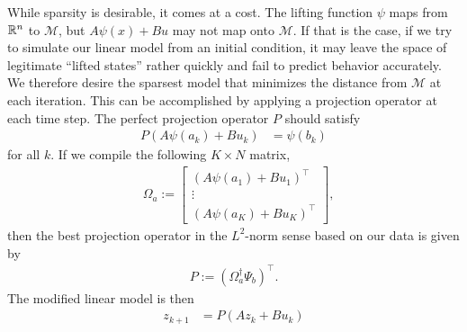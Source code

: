 While sparsity is desirable, it comes at a cost.
The lifting function $\psi$ maps from $\mathbb{R}^n$ to $\mathcal{M}$, but $A\psi(x) + B u$ may not map onto $\mathcal{M}$.
If that is the case, if we try to simulate our linear model from an initial condition, it may leave the space of legitimate ``lifted states'' rather quickly and fail to predict behavior accurately.
We therefore desire the sparsest model that minimizes the distance from $\mathcal{M}$ at each iteration.
This can be accomplished by applying a projection operator at each time step.
The perfect projection operator $P$ should satisfy
\begin{align}
    P \left( A {\psi}(a_k) + B u_k \right) &= \psi(b_k)
\end{align}
for all $k$. 
If we compile the following $K \times N$ matrix,
\begin{align}
    &\Omega_a := \begin{bmatrix} \left( A {\psi}(a_1) + B u_1 \right)^\top \\ \vdots \\  \left( A {\psi}(a_K) + B u_K \right)^\top \end{bmatrix},
    \label{eq:Omega}
\end{align}
then the best projection operator in the $L^2$-norm sense based on our data is given by
\begin{align}
    P := \left( \Omega_{a}^\dagger \Psi_b \right)^\top.
\end{align}
The modified linear model is then 
\begin{align}
    z_{k+1} &= P \left( A z_k + B u_k \right)
    \label{eq:linSys_wP}
\end{align}

